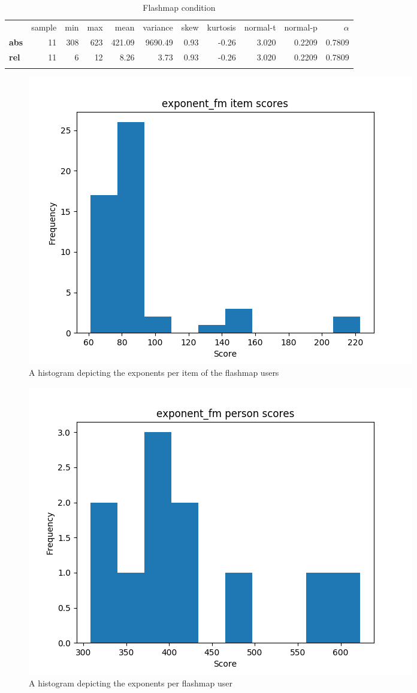 \begin{longtable}[c]{@{}lrrrrrrrrrr@{}}
    \caption{Flashmap condition}
    \endfirsthead
\toprule\addlinespace
& sample & min & max & mean & variance & skew & kurtosis & normal-t &
normal-p & $\alpha$
\\\addlinespace
\midrule
\textbf{abs} & 11 & 308 & 623 & 421.09 & 9690.49 & 0.93 & -0.26 & 3.020
& 0.2209 & 0.7809
\\\addlinespace
\textbf{rel} & 11 & 6 & 12 & 8.26 & 3.73 & 0.93 & -0.26 & 3.020 & 0.2209
& 0.7809
\\\addlinespace
\bottomrule
    \label{tab:exponent_fm}
\end{longtable}

\begin{figure}
\includegraphics[width=\textwidth]{img/exponent_fm_diff.png}
    \caption{A histogram depicting the exponents per item of the flashmap users}
    \label{fig:exponent_fm_diff}
\end{figure}
\begin{figure}
\includegraphics[width=\textwidth]{img/exponent_fm_abil.png}
    \caption{A histogram depicting the exponents per flashmap user}
    \label{fig:exponent_fm_abil}
\end{figure}

